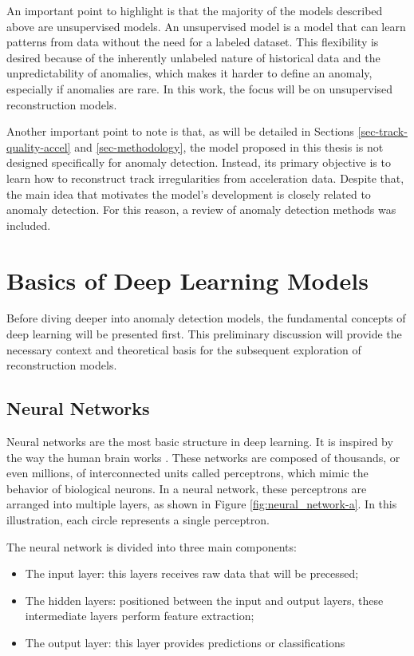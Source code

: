 An important point to highlight is that the majority of the models described above are unsupervised models. An unsupervised model is a model that can learn patterns from data without the need for a labeled dataset. This flexibility is desired because of the inherently unlabeled nature of historical data and the unpredictability of anomalies, which makes it harder to define an anomaly, especially if anomalies are rare. In this work, the focus will be on unsupervised reconstruction models.

Another important point to note is that, as will be detailed in Sections \ref{sec-track-quality-accel} and \ref{sec-methodology}, the model proposed in this thesis is not designed specifically for anomaly detection. Instead, its primary objective is to learn how to reconstruct track irregularities from acceleration data. Despite that, the main idea that motivates the model's development is closely related to anomaly detection. For this reason, a review of anomaly detection methods was included.

\section{Basics of Deep Learning Models}

Before diving deeper into anomaly detection models, the fundamental concepts of deep learning will be presented first. This preliminary discussion will provide the necessary context and theoretical basis for the subsequent exploration of reconstruction models.

\subsection{Neural Networks} \label{sec-Neural_networks}

Neural networks are the most basic structure in deep learning. It is inspired by the way the human brain works \cite{AGATONOVICKUSTRIN2000717}. These networks are composed of thousands, or even millions, of interconnected units called perceptrons, which mimic the behavior of biological neurons. In a neural network, these perceptrons are arranged into multiple layers, as shown in Figure \ref{fig:neural_network-a}. In this illustration, each circle represents a single perceptron. 

The neural network is divided into three main components: 
\begin{itemize}
    \item The input layer: this layers receives raw data that will be precessed;
    \item The hidden layers: positioned between the input and output layers, these intermediate layers perform feature extraction;
    \item The output layer: this layer provides predictions or classifications
\end{itemize}

